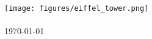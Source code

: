 \begin{titlepage}
\begin{center}
{\huge \bfseries \cim}\\[0.8cm]
\texttt{[image: figures/eiffel\_tower.png]}\\
\vfill
{\LARGE \bfseries \palyazok}\\[0.8cm]
{\large \today}
\end{center}
\end{titlepage}



